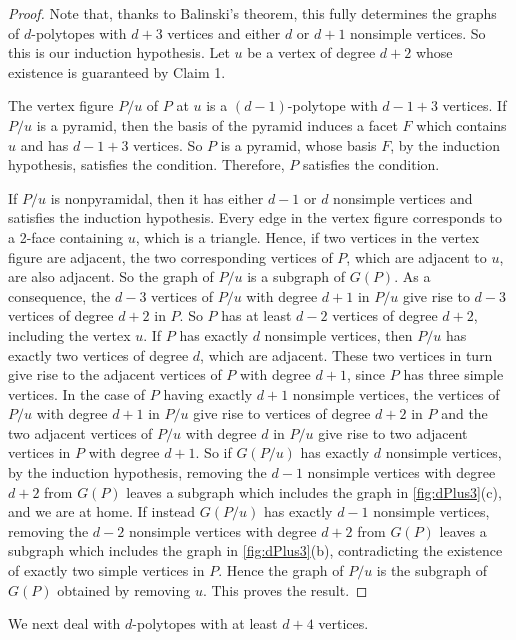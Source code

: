 \documentclass[a4paper]{amsart}
\theoremstyle{definition}
\theoremstyle{remark}
\begin{document}
\begin{proof}
Note that, thanks to Balinski's theorem, this fully determines the graphs of $d$-polytopes with $d+3$ vertices  and either $d$ or $d+1$ nonsimple vertices. So this is our induction hypothesis. Let $u$ be a vertex of degree $d+2$ whose existence is guaranteed by Claim 1.

The vertex figure $P/u$ of $P$ at $u$ is a $(d-1)$-polytope with $d-1+3$ vertices. If $P/u$ is a pyramid, then  the basis of the pyramid induces a facet $F$ which contains $u$ and has $d-1+3$ vertices. So $P$ is a pyramid, whose basis $F$, by the induction hypothesis, satisfies the condition. Therefore, $P$ satisfies the condition.

If $P/u$ is nonpyramidal, then it has either $d-1$ or $d$ nonsimple vertices and satisfies the induction hypothesis. Every edge in the vertex figure corresponds to a 2-face containing $u$, which is a triangle. Hence, if two vertices in the vertex figure are adjacent, the two corresponding vertices of $P$, which are adjacent to $u$,  are also adjacent. So the graph of $P/u$ is a subgraph of $G(P)$. As a consequence, the $d-3$ vertices of $P/u$ with degree $d+1$ in $P/u$ give rise to $d-3$ vertices of degree $d+2$ in $P$. So $P$ has at least $d-2$ vertices of degree $d+2$, including the vertex $u$. If $P$ has exactly $d$ nonsimple vertices, then $P/u$ has exactly two vertices of degree $d$, which are adjacent. These two vertices in turn  give rise to the adjacent vertices of $P$ with degree $d+1$, since $P$ has three simple vertices. In the case of $P$ having exactly $d+1$ nonsimple vertices, the vertices of $P/u$ with degree $d+1$ in $P/u$ give rise to vertices of degree $d+2$ in $P$ and the two adjacent vertices of $P/u$ with degree $d$ in $P/u$ give rise to two adjacent vertices in $P$ with degree $d+1$. So if   $G(P/u)$ has exactly $d$ nonsimple vertices, by the induction hypothesis, removing the $d-1$ nonsimple vertices with degree $d+2$ from $G(P)$ leaves a subgraph which includes the graph in \cref{fig:dPlus3}(c), and we are at home. If instead $G(P/u)$ has exactly $d-1$ nonsimple vertices, removing the $d-2$ nonsimple vertices with degree $d+2$ from $G(P)$ leaves a subgraph which includes the graph in \cref{fig:dPlus3}(b),  contradicting the existence of exactly two simple vertices in $P$. Hence the graph of $P/u$ is the subgraph of $G(P)$ obtained by removing $u$. This proves the result.
\end{proof}

We next deal with $d$-polytopes with at least $d+4$ vertices.
	
\end{document}
